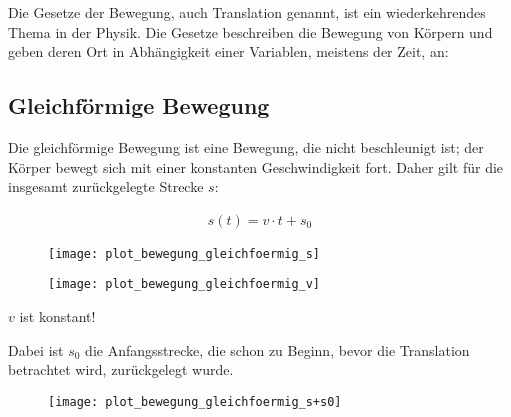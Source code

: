 Die Gesetze der Bewegung, auch Translation genannt, ist ein wiederkehrendes Thema in der Physik. Die Gesetze beschreiben die Bewegung von Körpern und geben deren Ort in Abhängigkeit einer Variablen, meistens der Zeit, an:

\subsection{Gleichförmige Bewegung} \label{subsec:gleichfoermig}

Die gleichförmige Bewegung ist eine Bewegung, die nicht beschleunigt ist; der Körper bewegt sich mit einer konstanten Geschwindigkeit fort. Daher gilt für die insgesamt zurückgelegte Strecke $s$:

\begin{align} \label{eq:gleichfoermig}
	s(t) = v \cdot t + s_0
\end{align}

\begin{figure}[h!]
	\centering
	\begin{minipage}[b]{0.4\linewidth}
		\begin{comment} Gnuplot:
set xlabel "t"
set ylabel "s(t)"
set output "plot_bewegung_gleichfoermig_s.png"
plot s(x) = 1x ls 1
		\end{comment}
    	\texttt{[image: plot\_bewegung\_gleichfoermig\_s]}
	\end{minipage}
	\quad
	\begin{minipage}[b]{0.4\linewidth}
		\begin{comment} Gnuplot:
set xlabel "t"
set ylabel "v(t)"
set output "plot_bewegung_gleichfoermig_v.png"
plot 1 ls 1
		\end{comment}
    	\texttt{[image: plot\_bewegung\_gleichfoermig\_v]}
	\end{minipage}
\end{figure}


\begin{Wichtig}
$v$ ist konstant!
\end{Wichtig}

\noindent Dabei ist $s_0$ die Anfangsstrecke, die schon zu Beginn, bevor die Translation betrachtet wird, zurückgelegt wurde.

\begin{figure}[h!]
	\centering
	\begin{comment} Gnuplot:
set xlabel "t"
set ylabel "v(t)"
set output "plot_bewegung_gleichfoermig_s+s0.png"
plot v(x) = 1x+1 ls 1
	\end{comment}
	\texttt{[image: plot\_bewegung\_gleichfoermig\_s+s0]}
\end{figure}


